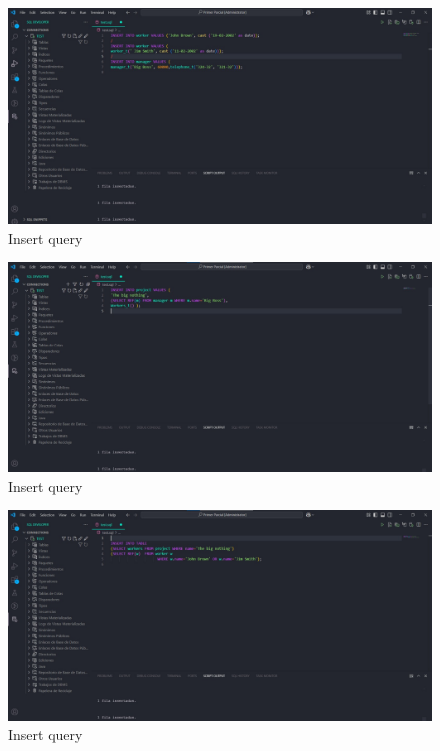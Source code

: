 \documentclass{article}
\begin{document}
\begin{figure}[H]
	\centering
	\includegraphics[width=1\textwidth]{imgs/inse1.jpeg}
	\caption{Insert query}
	\label{fig:9}
\end{figure}

\begin{figure}[H]
	\centering
	\includegraphics[width=1\textwidth]{imgs/inse2.jpeg}
	\caption{Insert query}
	\label{fig:10}
\end{figure}

\begin{figure}[H]
	\centering
	\includegraphics[width=1\textwidth]{imgs/inse3.jpeg}
	\caption{Insert query}
	\label{fig:11}
\end{figure}
\end{document}
